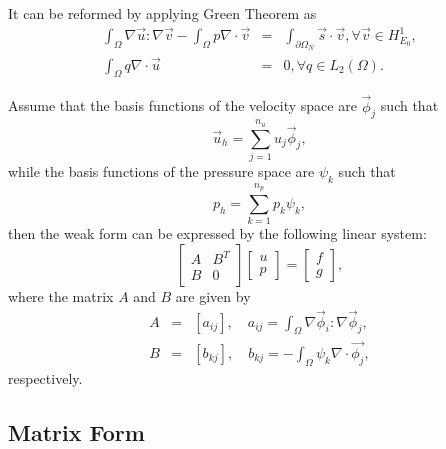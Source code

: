 \documentclass[a4paper]{article}
\begin{document}
It can be reformed by applying Green Theorem as
\begin{equation}
\begin{array}{rcl}
\int_\Omega \nabla \vec{u} : \nabla \vec{v} - \int_\Omega p\nabla
\cdot \vec{v} &=& \int_{\partial \Omega_N}\vec{s}\cdot \vec{v},
\forall \vec{v} \in H^1_{E_0}, \\
\int_\Omega q\nabla \cdot \vec{u}
&=& 0, \forall q \in L_2(\Omega).
\label{eq::Stokes}
\end{array}
\end{equation}

Assume that the basis functions of the velocity space are
{$\vec{\phi}_j$} such that
\begin{equation}
\vec{u}_h = \sum^{n_u}_{j=1}u_j\vec{\phi}_j,
\label{eq::Stokes-u}
\end{equation}
while the basis functions of the pressure space are $\psi_k$ such that
\begin{equation}
p_h = \sum^{n_p}_{k=1}p_k\psi_k,
\label{eq::Stokes-p}
\end{equation}
then the weak form can be expressed by the following linear system:
\begin{equation}
\left[ \begin{array}{ccc}
A & B^T \\
B & 0
\end{array}
\right]
\left[\begin{array}{ccc}
u\\
p
\end{array}
\right]=
\left[\begin{array}{ccc}
f\\
g
\end{array}
\right],
\label{mt::Stokes}
\end{equation}
where the matrix $A$ and $B$ are given by
\begin{equation}
\begin{array}{rcl}
A &=& [a_{ij}], \quad a_{ij} = \int_{\Omega} \nabla \vec{\phi}_i :
\nabla \vec{\phi}_j,\\ B &=& [b_{kj}], \quad b_{kj} = -\int_{\Omega}
\psi_k\nabla \cdot \vec{\phi_j},
\end{array}
\end{equation}
respectively.


\subsection{Matrix Form}
\end{document}
